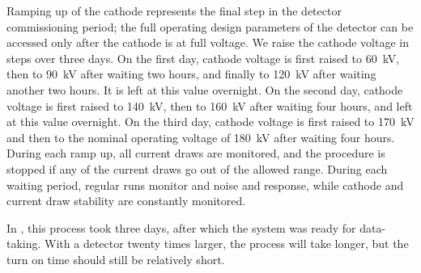 Ramping up of the cathode  represents the final step in the detector commissioning period; the full operating design parameters of the  detector can be accessed only after the cathode is at full voltage. 
We raise the cathode voltage in steps over three days. 
On the first day, cathode voltage is first raised to \SI{60}{kV}, then to \SI{90}{kV} after waiting two hours, and finally to \SI{120}{kV} after waiting another two hours. It is left at this value overnight.
On the second day, cathode voltage is first raised to \SI{140}{kV}, then to \SI{160}{kV} after waiting four hours, and left at this value overnight. 
On the third day, cathode voltage is first raised to \SI{170}{kV} and then to the nominal operating voltage of \SI{180}{kV} after waiting four hours. 
During each  ramp up, all  current draws are monitored, and the procedure is stopped if any of the current draws go out of the allowed range. 
During each waiting period, regular  runs monitor  and  noise and response, while cathode  and current draw stability are constantly monitored.

In , this process took three days, after which the system was  ready for data-taking. With a detector twenty times larger, the process will take longer, but the turn on time should still be relatively short. 